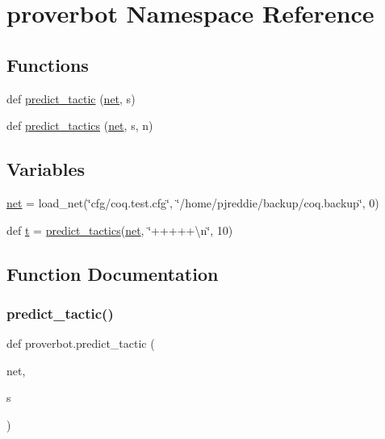 \hypertarget{namespaceproverbot}{}\section{proverbot Namespace Reference}
\label{namespaceproverbot}
\subsection*{Functions}
\begin{DoxyCompactItemize}
\item 
def \mbox{\hyperlink{namespaceproverbot_abe8038e870cb12d57b55396847f5c463}{predict\+\_\+tactic}} (\mbox{\hyperlink{namespaceproverbot_a76d62031ec897d73169a3dd75791259a}{net}}, s)
\item 
def \mbox{\hyperlink{namespaceproverbot_ab0692d97bc0c5fb3229d3ab3b0f5d0e3}{predict\+\_\+tactics}} (\mbox{\hyperlink{namespaceproverbot_a76d62031ec897d73169a3dd75791259a}{net}}, s, n)
\end{DoxyCompactItemize}
\subsection*{Variables}
\begin{DoxyCompactItemize}
\item 
\mbox{\hyperlink{namespaceproverbot_a76d62031ec897d73169a3dd75791259a}{net}} = load\+\_\+net(\char`\"{}cfg/coq.\+test.\+cfg\char`\"{}, \char`\"{}/home/pjreddie/backup/coq.\+backup\char`\"{}, 0)
\item 
def \mbox{\hyperlink{namespaceproverbot_aeda027db8b7d08f176f7192ec62bfbf2}{t}} = \mbox{\hyperlink{namespaceproverbot_ab0692d97bc0c5fb3229d3ab3b0f5d0e3}{predict\+\_\+tactics}}(\mbox{\hyperlink{namespaceproverbot_a76d62031ec897d73169a3dd75791259a}{net}}, \char`\"{}+++++\textbackslash{}n\char`\"{}, 10)
\end{DoxyCompactItemize}


\subsection{Function Documentation}
\mbox{\label{namespaceproverbot_abe8038e870cb12d57b55396847f5c463}} 
\subsubsection{\texorpdfstring{predict\_tactic()}{predict\_tactic()}}
{\footnotesize\ttfamily def proverbot.\+predict\+\_\+tactic (\begin{DoxyParamCaption}\item[{}]{net,  }\item[{}]{s }\end{DoxyParamCaption})}



